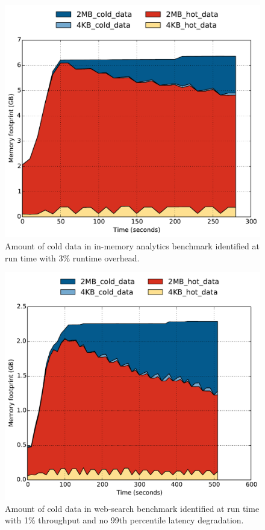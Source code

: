 %
\begin{figure}[t]
\centering
\includegraphics[width=0.8\columnwidth]{asplos2017/figures/ina-6g-new-policy-capacity_over_time.pdf}
\caption{Amount of cold data in in-memory analytics benchmark identified at run
time with 3\% runtime overhead.}
\label{fig:in-memory-analytics-capacity}
\end{figure}

\begin{figure}[t]
\centering
\includegraphics[width=0.8\columnwidth]{asplos2017/figures/wb-hugetmpfs-capacity_over_time.pdf}
\caption{Amount of cold data in web-search benchmark identified at run
time with 1\% throughput and no 99th percentile latency degradation.}
\label{fig:web-search-capacity}
\end{figure}

